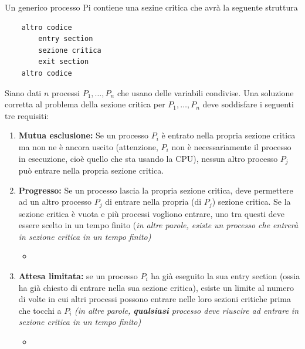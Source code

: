 Un generico processo Pi contiene una sezine critica che avrà la seguente struttura
\begin{verbatim}
    altro codice
        entry section
        sezione critica
        exit section
    altro codice
\end{verbatim}
\bigskip
Siano dati $n$ processi $P_1, \ldots, P_n$ che usano delle variabili condivise. Una soluzione corretta al problema della sezione critica per $P_1, \ldots, P_n$ deve soddisfare i seguenti tre requisiti:

\begin{enumerate}
    \item \textbf{Mutua esclusione:} Se un processo $P_i$ è entrato nella propria sezione critica ma non ne è ancora uscito (attenzione, $P_i$ non è necessariamente il processo in esecuzione, cioè quello che sta usando la CPU), nessun altro processo $P_j$ può entrare nella propria sezione critica.
    \item \textbf{Progresso:} Se un processo lascia la propria sezione critica, deve permettere ad un altro processo $P_j$ di entrare nella propria (di $P_j$) sezione critica. Se la sezione critica è vuota e più processi vogliono entrare, uno tra questi deve essere scelto in un tempo finito (\textit{in altre parole, esiste un processo che entrerà in sezione critica in un tempo finito)}
    \begin{itemize}
        \item {}
    \end{itemize}
    \item \textbf{Attesa limitata:} se un processo $P_i$ ha già eseguito la sua entry section (ossia ha già chiesto di entrare nella sua sezione critica), esiste un limite al numero di volte in cui altri processi possono entrare nelle loro sezioni critiche prima che tocchi a $P_i$ \textit{(in altre parole, \textbf{qualsiasi} processo deve riuscire ad entrare in sezione critica in un tempo finito)}
    \begin{itemize}
        \item {}
    \end{itemize}
\end{enumerate}
